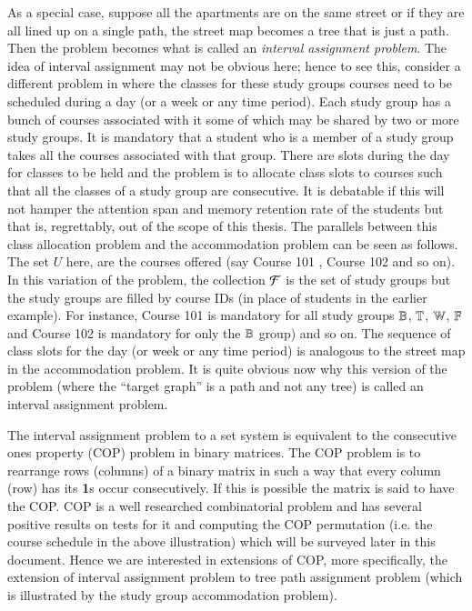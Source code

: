 \documentclass[MS,synopsis]{iitmdiss}
\def \un {\bf 1}
\begin{document}
As a special case, suppose all the apartments are on the same street
or if they are all lined up on a single path, the street map becomes a
tree that is just a path. Then the problem becomes what is called an
{\em interval assignment problem}. The idea of interval assignment may
not be obvious here; hence to see this, consider a different problem
in {\WSI} where the classes for these study groups courses need to be
scheduled during a day (or a week or any time period). Each study
group has a bunch of courses associated with it some of which may be
shared by two or more study groups. It is mandatory that a student who
is a member of a study group takes all the courses associated with
that group. There are slots during the day for classes to be held and
the problem is to allocate class slots to courses such that all the
classes of a study group are consecutive. It is debatable if this will
not hamper the attention span and memory retention rate of the
students but that is, regrettably, out of the scope of this
thesis. The parallels between this class allocation problem and the
accommodation problem can be seen as follows. The set $U$ here, are
the courses offered (say Course 101 {\coneohone}, Course 102
{\coneohtwo} and so on). In this variation of the problem, the
collection ${\cal F}$ is the set of study groups but the study groups are
filled by course IDs (in place of students in the earlier
example). For instance, Course 101 is mandatory for all study groups
$\mathbb{B}$, $\mathbb{T}$, $\mathbb{W}$, $\mathbb{F}$ and Course 102 is mandatory for
only the $\mathbb{B}$ group) and so on. The sequence of class slots for the
day (or week or any time period) is analogous to the street map in the
accommodation problem. It is quite obvious now why this version of the
problem (where the ``target graph'' is a path and not any
tree) is called an interval assignment
problem.

The interval assignment problem to a set system is equivalent to the
consecutive ones property (COP) problem in binary matrices\cite{wlh02,
  nsnrs09}.  The COP problem is to rearrange rows (columns) of a
binary matrix in such a way that every column (row) has its {\un}s
occur consecutively. If this is possible the matrix is said to have
the COP.  COP is a well researched combinatorial problem and has
several positive results on tests for it and computing the COP
permutation (i.e. the course schedule in the above illustration) which
will be surveyed later in this document. Hence we are interested in
extensions of COP, more specifically, the extension of interval
assignment problem to tree path assignment problem (which is
illustrated by the study group accommodation problem).
\end{document}
